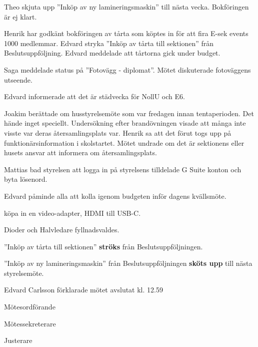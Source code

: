 \documentclass[10pt]{article}
\def\mo{Edvard Carlsson}
\def\ms{Mattias Lundström}
\def\ji{Jakob Pettersson}
\begin{document}
\begin{paragrafer}
Theo \ypa skjuta upp ''Inköp av ny lamineringsmaskin'' till nästa vecka. Bokföringen är ej klart.

\Mbaby

Henrik har godkänt bokföringen av tårta som köptes in för att fira E-sek events 1000 medlemmar. 
Edvard \ypa stryka ''Inköp av tårta till sektionen'' från Beslutsuppföljning. Edvard meddelade att tårtorna gick under budget. 

\Mbaby

Saga meddelade status på ''Fotovägg - diplomat''. Mötet diskuterade fotoväggens utseende. 


Edvard informerade att det är städvecka för NollU och E6. 

Joakim berättade om husstyrelsemöte som var fredagen innan tentaperioden. Det hände inget speciellt. Undersökning efter brandövningen visade att många inte visste var deras återsamlingsplats var. 
Henrik sa att det förut togs upp på funktionärsinformation i skolstartet. Mötet undrade om det är sektionens eller husets ansvar att informera om återsamlingsplats.

Mattias bad styrelsen att logga in på styrelsens tilldelade G Suite konton och byta lösenord. 

Edvard påminde alla att kolla igenom budgeten inför dagens kvällsmöte. 



\Mba köpa in en video-adapter, HDMI till USB-C.

Dioder och Halvledare fyllnadsvaldes. 

''Inköp av tårta till sektionen'' \textbf{ströks} från Beslutsuppföljningen.

''Inköp av ny lamineringsmaskin'' från Beslutsuppföljningen \textbf{sköts upp} till nästa styrelsemöte. 

{\mo} förklarade mötet avslutat kl. 12.59
\end{paragrafer}

\hidesignfoot
\begin{signatures}{3}
\signature{\mo}{Mötesordförande}
\signature{\ms}{Mötessekreterare}
\signature{\ji}{Justerare}
\end{signatures}
\end{document}
